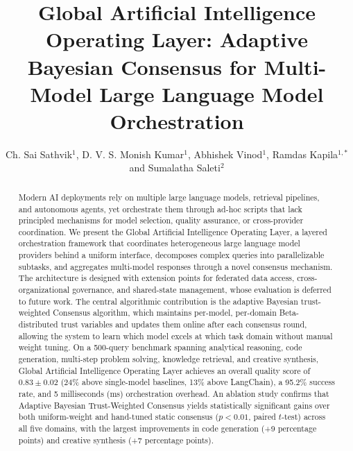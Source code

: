 \documentclass{iopjournal}
\providecommand{\articletype}[1]{}
\providecommand{\affil}[1]{}
\providecommand{\email}[1]{}
\providecommand{\keywords}[1]{}
\begin{document}
\articletype{Paper}

\title{Global Artificial Intelligence Operating Layer: Adaptive Bayesian Consensus for Multi-Model Large Language Model Orchestration}

\author{Ch. Sai Sathvik$^1$, D. V. S. Monish Kumar$^1$, Abhishek Vinod$^1$, Ramdas Kapila$^{1,*}$ and Sumalatha Saleti$^2$}

\affil{$^1$Dept. of CSE (Data Science), B. V. Raju Institute of Information Technology, Hyderabad, Telangana, India}

\affil{$^2$Dept. of CSE, SRM University AP, Amaravati, Andhra Pradesh, India}

\affil{$^*$Author to whom any correspondence should be addressed.}

\email{kapilaramdas@gmail.com}

\keywords{Global Artificial Intelligence Operating Layer, Large Language Models, Multi-Agent Systems, AI Governance, Model Orchestration, Bayesian Consensus}

\begin{abstract}
Modern AI deployments rely on multiple large language models, retrieval pipelines, and autonomous agents, yet orchestrate them through ad-hoc scripts that lack principled mechanisms for model selection, quality assurance, or cross-provider coordination. We present the Global Artificial Intelligence Operating Layer, a layered orchestration framework that coordinates heterogeneous large language model providers behind a uniform interface, decomposes complex queries into parallelizable subtasks, and aggregates multi-model responses through a novel consensus mechanism. The architecture is designed with extension points for federated data access, cross-organizational governance, and shared-state management, whose evaluation is deferred to future work. The central algorithmic contribution is the adaptive Bayesian trust-weighted Consensus algorithm, which maintains per-model, per-domain Beta-distributed trust variables and updates them online after each consensus round, allowing the system to learn which model excels at which task domain without manual weight tuning. On a 500-query benchmark spanning analytical reasoning, code generation, multi-step problem solving, knowledge retrieval, and creative synthesis, Global Artificial Intelligence Operating Layer achieves an overall quality score of $0.83 \pm 0.02$ (24\% above single-model baselines, 13\% above LangChain), a 95.2\% success rate, and 5 milliseconds (ms) orchestration overhead. An ablation study confirms that Adaptive Bayesian Trust-Weighted Consensus yields statistically significant gains over both uniform-weight and hand-tuned static consensus ($p < 0.01$, paired $t$-test) across all five domains, with the largest improvements in code generation (+9 percentage points) and creative synthesis (+7 percentage points).
\end{abstract}
\end{document}
